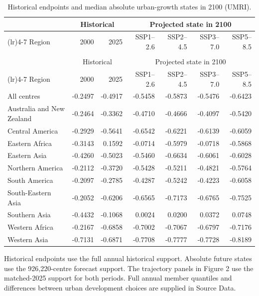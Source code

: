 \begingroup\small\setlength{\tabcolsep}{4pt}\renewcommand{\arraystretch}{1.14}
\begin{longtable}{>{\raggedright\arraybackslash}p{43mm}rrrrrr}
\caption{Historical endpoints and median absolute urban-growth states in 2100 (UMRI).}\label{tab:si_endpoints}\\
\toprule
 & \multicolumn{2}{c}{Historical} & \multicolumn{4}{c}{Projected state in 2100}\\
\cmidrule(lr){2-3}\cmidrule(lr){4-7}
Region & 2000 & 2025 & SSP1--2.6 & SSP2--4.5 & SSP3--7.0 & SSP5--8.5\\
\midrule
\endfirsthead
\multicolumn{7}{l}{\small\textit{Supplementary Table \thetable\ continued}}\\
\toprule
 & \multicolumn{2}{c}{Historical} & \multicolumn{4}{c}{Projected state in 2100}\\
\cmidrule(lr){2-3}\cmidrule(lr){4-7}
Region & 2000 & 2025 & SSP1--2.6 & SSP2--4.5 & SSP3--7.0 & SSP5--8.5\\
\midrule
\endhead
\bottomrule
\endfoot
All centres & -0.2497 & -0.4917 & -0.5458 & -0.5873 & -0.5476 & -0.6423\\
Australia and New Zealand & -0.2464 & -0.3362 & -0.4710 & -0.4666 & -0.4097 & -0.5420\\
Central America & -0.2929 & -0.5641 & -0.6542 & -0.6221 & -0.6139 & -0.6059\\
Eastern Africa & -0.3143 & 0.1592 & -0.0714 & -0.5979 & -0.0718 & -0.5868\\
Eastern Asia & -0.4260 & -0.5023 & -0.5460 & -0.6634 & -0.6061 & -0.6028\\
Northern America & -0.2112 & -0.3720 & -0.5428 & -0.5211 & -0.4821 & -0.5764\\
South America & -0.2097 & -0.2785 & -0.4287 & -0.5242 & -0.4223 & -0.6058\\
South-Eastern Asia & -0.2052 & -0.6206 & -0.6565 & -0.7173 & -0.6765 & -0.7525\\
Southern Asia & -0.4432 & -0.1068 & 0.0024 & 0.0200 & 0.0372 & 0.0748\\
Western Africa & -0.2167 & -0.6858 & -0.7002 & -0.7067 & -0.6797 & -0.7176\\
Western Asia & -0.7131 & -0.6871 & -0.7708 & -0.7777 & -0.7728 & -0.8189\\
\end{longtable}
{\small Historical endpoints use the full annual historical support. Absolute future states use the 926,220-centre forecast support. The trajectory panels in Figure 2 use the matched-2025 support for both periods. Full annual member quantiles and differences between urban development choices are supplied in Source Data.\par}
\endgroup

